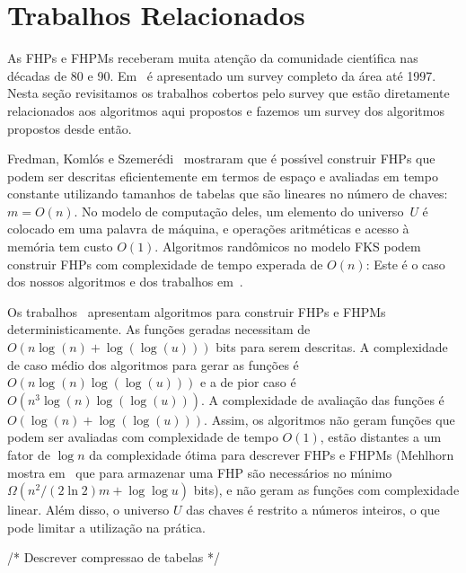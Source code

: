 \section{Trabalhos Relacionados}
As FHPs e FHPMs receberam muita aten\c{c}\~ao da comunidade 
cient\'{\i}fica nas d\'ecadas de 80 e 90. Em~\cite{chm97} \'e 
apresentado um survey completo da \'area at\'e 1997.
Nesta se\c{c}\~ao revisitamos os trabalhos cobertos pelo survey que
est\~ao diretamente relacionados aos algoritmos aqui propostos e
fazemos um survey dos algoritmos propostos desde ent\~ao.
 
Fredman, Koml\'os e Szemer\'edi~\cite{FKS84} mostraram que \'e poss\'{\i}vel construir
FHPs que podem ser descritas eficientemente em termos de espa\c{c}o e avaliadas em 
tempo constante utilizando tamanhos de tabelas que s\~ao lineares no n\'umero de chaves:
$m=O(n)$. 
No modelo de computa\c{c}\~ao deles, um elemento do universo~$U$ \'e colocado em uma 
palavra de m\'aquina, e opera\c{c}\~oes aritm\'eticas e acesso \`a mem\'oria tem custo 
$O(1)$.
Algoritmos rand\^omicos no modelo FKS podem construir FHPs com complexidade de tempo 
experada de $O(n)$: 
Este \'e o caso dos nossos algoritmos e dos trabalhos em~\cite{chm92,p99}.

Os trabalhos~\cite{asw00,swz00} apresentam algoritmos para construir
FHPs e FHPMs deterministicamente. 
As fun\c{c}\~oes geradas necessitam de $O(n \log(n) + \log(\log(u)))$ bits para serem descritas.
A complexidade de caso m\'edio dos algoritmos para gerar as fun\c{c}\~oes \'e 
$O(n\log(n) \log( \log (u)))$ e a de pior caso \'e $O(n^3\log(n) \log(\log(u)))$. 
A complexidade de avalia\c{c}\~ao das fun\c{c}\~oes \'e $O(\log(n) + \log(\log(u)))$.
Assim, os algoritmos n\~ao geram fun\c{c}\~oes que podem ser avaliadas com complexidade 
de tempo $O(1)$, est\~ao distantes a um fator de $\log n$ da complexidade \'otima para descrever 
FHPs e FHPMs (Mehlhorn mostra em~\cite{m84} 
que para armazenar uma FHP s\~ao necess\'arios no m\'{\i}nimo 
$\Omega(n^2/(2\ln 2) m + \log\log u)$ bits), e n\~ao geram as 
fun\c{c}\~oes com complexidade linear.
Al\'em disso, o universo $U$ das chaves \'e restrito a n\'umeros inteiros, o que pode 
limitar a utiliza\c{c}\~ao na pr\'atica. 

/* Descrever compressao de tabelas */
\cite{gss01}

\cite{bkz05}
